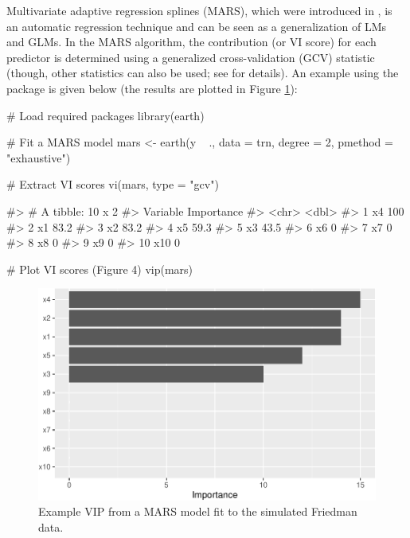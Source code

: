 Multivariate adaptive regression splines (MARS), which were introduced
in \citet{multivariate-friedman-1991}, is an automatic regression
technique and can be seen as a generalization of LMs and GLMs. In the
MARS algorithm, the contribution (or VI score) for each predictor is
determined using a generalized cross-validation (GCV) statistic (though,
other statistics can also be used; see  for
details). An example using the  package \citep{R-earth}
is given below (the results are plotted in Figure \ref{fig:vip-earth}):

\begin{Schunk}
\begin{Sinput}
# Load required packages
library(earth)

# Fit a MARS model
mars <- earth(y ~ ., data = trn, degree = 2, pmethod = "exhaustive")

# Extract VI scores
vi(mars, type = "gcv")
\end{Sinput}
\begin{Soutput}
#> # A tibble: 10 x 2
#>    Variable Importance
#>    <chr>         <dbl>
#>  1 x4            100  
#>  2 x1             83.2
#>  3 x2             83.2
#>  4 x5             59.3
#>  5 x3             43.5
#>  6 x6              0  
#>  7 x7              0  
#>  8 x8              0  
#>  9 x9              0  
#> 10 x10             0
\end{Soutput}
\begin{Sinput}
# Plot VI scores (Figure 4)
vip(mars)
\end{Sinput}
\begin{figure}[!htb]

{\centering \includegraphics[width=0.7\linewidth]{greenwell-boehmke_files/figure-latex/vip-earth-1} 

}

\caption[Example VIP from a MARS model fit to the simulated Friedman data]{Example VIP from a MARS model fit to the simulated Friedman data.}\label{fig:vip-earth}
\end{figure}
\end{Schunk}

